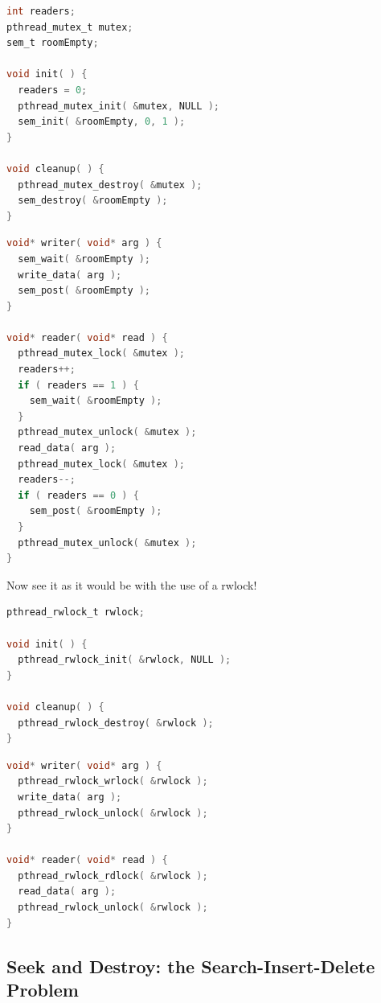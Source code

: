 \documentclass[a4paper]{report}
\begin{document}
\begin{multicols}{2}
	\begin{lstlisting}[language=C]
int readers;
pthread_mutex_t mutex;
sem_t roomEmpty;

void init( ) {
  readers = 0;
  pthread_mutex_init( &mutex, NULL );
  sem_init( &roomEmpty, 0, 1 );
}

void cleanup( ) {
  pthread_mutex_destroy( &mutex );
  sem_destroy( &roomEmpty );
}
\end{lstlisting}

	\columnbreak

	\begin{lstlisting}[language=C]
void* writer( void* arg ) {
  sem_wait( &roomEmpty );
  write_data( arg );
  sem_post( &roomEmpty );
}

void* reader( void* read ) {
  pthread_mutex_lock( &mutex );
  readers++;
  if ( readers == 1 ) {
    sem_wait( &roomEmpty );
  }
  pthread_mutex_unlock( &mutex );
  read_data( arg );
  pthread_mutex_lock( &mutex );
  readers--;
  if ( readers == 0 ) {
    sem_post( &roomEmpty );
  }
  pthread_mutex_unlock( &mutex );
}
\end{lstlisting}

\end{multicols}

Now see it as it would be with the use of a rwlock!

\begin{multicols}{2}
	\begin{lstlisting}[language=C]
pthread_rwlock_t rwlock;

void init( ) {
  pthread_rwlock_init( &rwlock, NULL );
}

void cleanup( ) {
  pthread_rwlock_destroy( &rwlock );
}
\end{lstlisting}

	\columnbreak

	\begin{lstlisting}[language=C]
void* writer( void* arg ) {
  pthread_rwlock_wrlock( &rwlock );
  write_data( arg );
  pthread_rwlock_unlock( &rwlock );
}

void* reader( void* read ) {
  pthread_rwlock_rdlock( &rwlock );
  read_data( arg );
  pthread_rwlock_unlock( &rwlock );
}
\end{lstlisting}

\end{multicols}

\subsection*{Seek and Destroy: the Search-Insert-Delete Problem}
\end{document}
